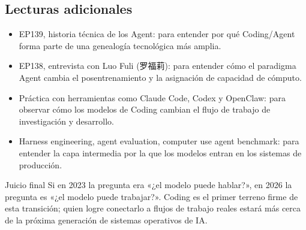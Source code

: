 \subsection{Lecturas adicionales}

\begin{itemize}
\item EP139, historia técnica de los Agent: para entender por qué Coding/Agent forma parte de una genealogía tecnológica más amplia.
\item EP138, entrevista con Luo Fuli (罗福莉): para entender cómo el paradigma Agent cambia el posentrenamiento y la asignación de capacidad de cómputo.
\item Práctica con herramientas como Claude Code, Codex y OpenClaw: para observar cómo los modelos de Coding cambian el flujo de trabajo de investigación y desarrollo.
\item Harness engineering, agent evaluation, computer use agent benchmark: para entender la capa intermedia por la que los modelos entran en los sistemas de producción.
\end{itemize}

\begin{importantbox}{Juicio final}
Si en 2023 la pregunta era «¿el modelo puede hablar?», en 2026 la pregunta es «¿el modelo puede trabajar?». Coding es el primer terreno firme de esta transición; quien logre conectarlo a flujos de trabajo reales estará más cerca de la próxima generación de sistemas operativos de IA.
\end{importantbox}


